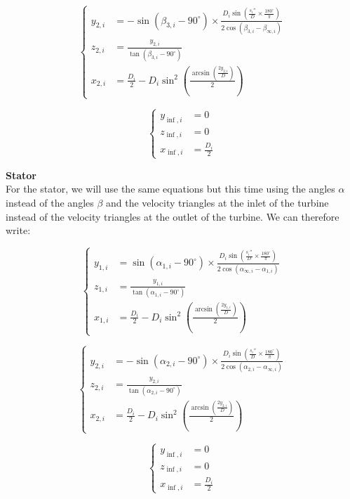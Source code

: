\begin{equation}
\left\{
\begin{aligned}
y_{2,i} &= -\sin(\beta_{3,i} - 90^\circ) \times \frac{D_i \sin\left(\frac{s_i''}{D} \times \frac{180^\circ}{\pi}\right)}{2 \cos(\beta_{3,i} - \beta_{\infty,i})}\\
z_{2,i} &= \frac{y_{2,i}}{\tan(\beta_{3,i} - 90^\circ)}\\
x_{2,i} &= \frac{D_i}{2} - D_i\sin^2\left(\frac{\arcsin\left(\frac{2y_{2,i}}{D}\right)}{2}\right)
\end{aligned}
\right.
\end{equation}

\begin{equation}
\left\{
\begin{aligned}
y_{\inf,i} &= 0\\
z_{\inf,i} &= 0\\
x_{\inf,i} &= \frac{D_i}{2}
\end{aligned}
\right.
\end{equation}

\textbf{Stator} \\
For the stator, we will use the same equations but this time using the angles $\alpha$ instead of the angles $\beta$ and the velocity triangles at the inlet of the turbine instead of the velocity triangles at the outlet of the turbine. We can therefore write:


\begin{equation}
\left\{
\begin{aligned}
y_{1,i} &= \sin(\alpha_{1,i} - 90^\circ) \times \frac{D_i \sin\left(\frac{s_i''}{D} \times \frac{180^\circ}{\pi}\right)}{2 \cos(\alpha_{\infty ,i} - \alpha_{1,i})}\\
z_{1,i} &= \frac{y_{1,i}}{\tan(\alpha_{1,i} - 90^\circ)}\\
x_{1,i} &= \frac{D_i}{2} - D_i\sin^2\left(\frac{\arcsin\left(\frac{2y_{1,i}}{D}\right)}{2}\right)
\end{aligned}
\right.
\end{equation}

\begin{equation}
\left\{
\begin{aligned}
y_{2,i} &= -\sin(\alpha_{2,i} - 90^\circ) \times \frac{D_i \sin\left(\frac{s_i''}{D} \times \frac{180^\circ}{\pi}\right)}{2 \cos(\alpha_{2,i} - \alpha_{\infty,i})}\\
z_{2,i} &= \frac{y_{2,i}}{\tan(\alpha_{2,i} - 90^\circ)}\\
x_{2,i} &= \frac{D_i}{2} - D_i\sin^2\left(\frac{\arcsin\left(\frac{2y_{2,i}}{D}\right)}{2}\right)
\end{aligned}
\right.
\end{equation}

\begin{equation}
\left\{
\begin{aligned}
y_{\inf,i} &= 0\\
z_{\inf,i} &= 0\\
x_{\inf,i} &= \frac{D_i}{2}
\end{aligned}
\right.
\end{equation}

